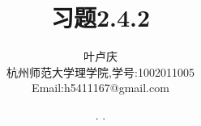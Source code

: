 \documentclass[a4paper, 12pt]{article} %
\makeatletter
\renewcommand{\maketitle}{ %
  \renewcommand\refname{参考文献}
  \newcommand{\D}{\displaystyle}\newcommand{\ri}{\Rightarrow}
  \newcommand{\ds}{\displaystyle} \renewcommand{\ni}{\noindent}
  \newcommand{\pa}{\partial} \newcommand{\Om}{\Omega}
  \newcommand{\om}{\omega} \newcommand{\sik}{\sum_{i=1}^k}
  \newcommand{\vov}{\Vert\omega\Vert} \newcommand{\Umy}{U_{\mu_i,y^i}}
  \newcommand{\lamns}{\lambda_n^{^{\scriptstyle\sigma}}}
  \newcommand{\chiomn}{\chi_{_{\Omega_n}}}
  \newcommand{\ullim}{\underline{\lim}} \newcommand{\bsy}{\boldsymbol}
  \newcommand{\mvb}{\mathversion{bold}} \newcommand{\la}{\lambda}
  \newcommand{\La}{\Lambda} \newcommand{\va}{\varepsilon}
  \newcommand{\be}{\beta} \newcommand{\al}{\alpha}
  \newcommand{\dis}{\displaystyle} \newcommand{\R}{{\mathbb R}}
  \newcommand{\N}{{\mathbb N}} \newcommand{\cF}{{\mathcal F}}
  \newcommand{\gB}{{\mathfrak B}} \newcommand{\eps}{\epsilon}
  \begin{flushright} %
    {\LARGE\@title} %
    
    \vspace{50pt} %
    
    {\large\@author} %
    \\\@date %
    
    \vspace{40pt} %
  \end{flushright}
}
\makeatother
\begin{document}
\begin{CJK}{UTF8}{gkai}
  \title{\textbf{习题2.4.2}} 
  \author{\small{叶卢庆}\\{\small{杭州师范大学理学院,学号:1002011005}}\\{\small{Email:h5411167@gmail.com}}} %
  \renewcommand{\today}{\number\year. \number\month. \number\day}
  \date{\today} %
  
  
  
  \maketitle %
  
  
  
  
  
  
  

\end{CJK}
\end{document}
